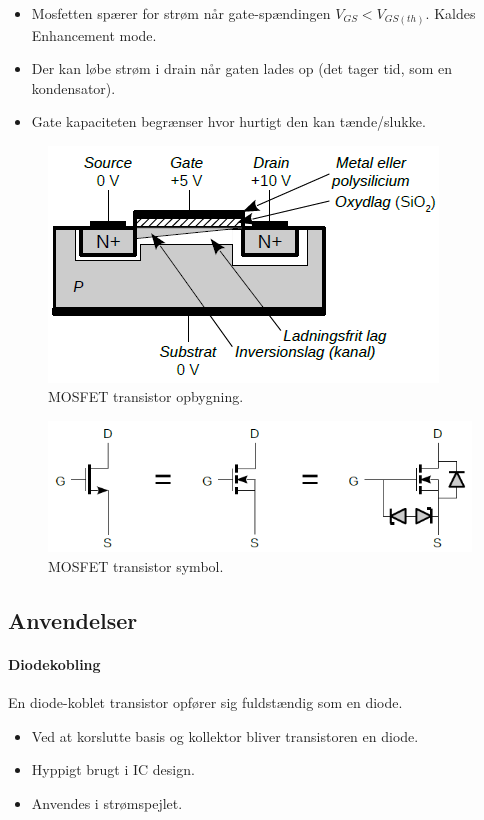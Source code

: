 \documentclass[danish]{article}
\begin{document}
\begin{itemize}
	\item Mosfetten spærer for strøm når gate-spændingen $V_{GS} < V_{GS (th)}$. Kaldes Enhancement mode.
	\item Der kan løbe strøm i drain når gaten lades op (det tager tid, som en kondensator).
	\item Gate kapaciteten begrænser hvor hurtigt den kan tænde/slukke.
\end{itemize}

\begin{figure} [H]
	\centering
	\includegraphics[width=0.5\linewidth]{graphics/mosfet}
	\caption{MOSFET transistor opbygning.}
	\label{fig:mosfet}
\end{figure}

\begin{figure} [H]
	\centering
	\includegraphics[width=0.8\linewidth]{graphics/mosfet_symbol}
	\caption{MOSFET transistor symbol.}
	\label{fig:mosfet_symbol}
\end{figure}

\subsection{Anvendelser}
\paragraph{Diodekobling} En diode-koblet transistor opfører sig fuldstændig som en diode.
\begin{itemize}
	\item Ved at korslutte basis og kollektor bliver transistoren en diode.
	\item Hyppigt brugt i IC design.
	\item Anvendes i strømspejlet.
\end{itemize}
\end{document}
